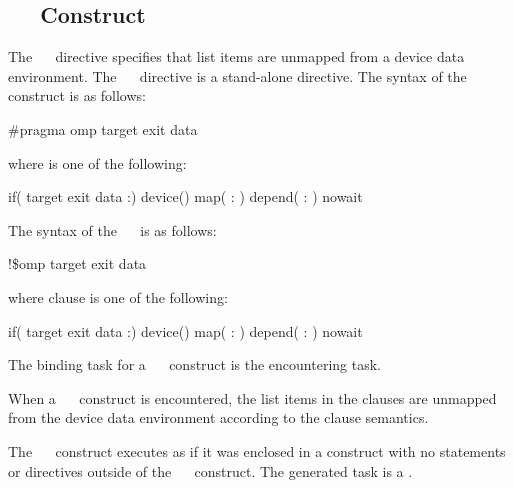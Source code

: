 \subsection{~~ Construct}
\label{subsec:target exit data Construct}
\summary
The ~~ directive specifies that list items are unmapped from a device data environment. The ~~ directive is a stand-alone directive.
\syntax
\ccppspecificstart
The syntax of the ~~ construct is as follows:
\begin{boxedcode}
\#pragma omp target exit data 
\end{boxedcode}
where  is one of the following:
\begin{indentedcodelist}
if(\plc{[} target exit data :\plc{] scalar-expression})
device()
map(\plc{[ [map-type-modifier[,]] map-type} : \plc{] list})
depend( : )
nowait
\end{indentedcodelist}
\ccppspecificend
\fortranspecificstart
The syntax of the ~~ is as follows:
\begin{boxedcode}
!\$omp target exit data 
\end{boxedcode}
where clause is one of the following:
\begin{indentedcodelist}
if(\plc{[} target exit data :\plc{] scalar-logical-expression})
device()
map(\plc{[ [map-type-modifier[,]] map-type} : \plc{] list})
depend( : )
nowait
\end{indentedcodelist}
\fortranspecificend
\binding
The binding task for a ~~ construct is the encountering task. 

\descr
When a ~~ construct is encountered, the list items in the  clauses are unmapped from the device data environment according to the  clause semantics.

The ~~ construct executes as if it was enclosed in a  construct with no statements or directives outside of the ~~ construct. The generated task is a .

